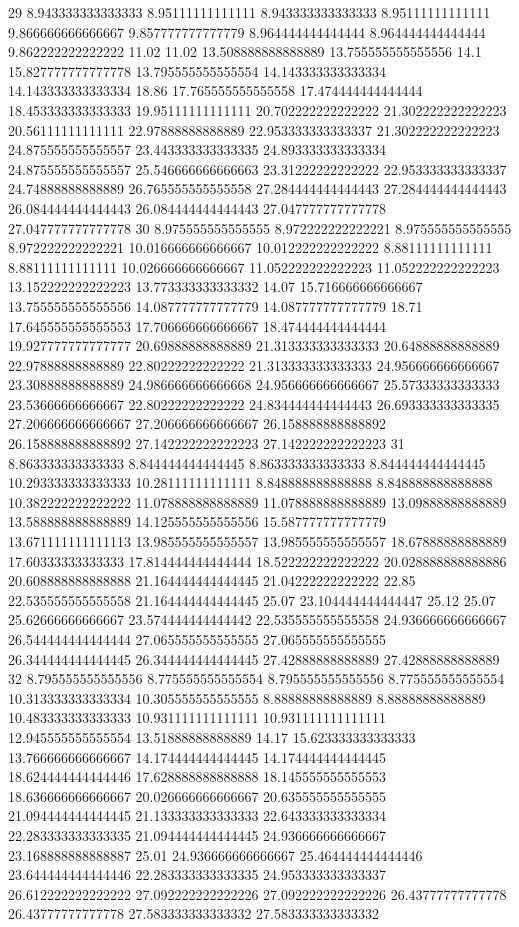 29 8.943333333333333 8.95111111111111 8.943333333333333 8.95111111111111 9.866666666666667 9.857777777777779 8.964444444444444 8.964444444444444 9.862222222222222 11.02 11.02 13.508888888888889 13.755555555555556 14.1 15.827777777777778 13.795555555555554 14.143333333333334 14.143333333333334 18.86 17.765555555555558 17.474444444444444 18.453333333333333 19.95111111111111 20.702222222222222 21.302222222222223 20.56111111111111 22.97888888888889 22.953333333333337 21.302222222222223 24.875555555555557 23.443333333333335 24.893333333333334 24.875555555555557 25.546666666666663 23.31222222222222 22.953333333333337 24.74888888888889 26.765555555555558 27.284444444444443 27.284444444444443 26.084444444444443 26.084444444444443 27.047777777777778 27.047777777777778
30 8.975555555555555 8.972222222222221 8.975555555555555 8.972222222222221 10.016666666666667 10.012222222222222 8.88111111111111 8.88111111111111 10.026666666666667 11.052222222222223 11.052222222222223 13.152222222222223 13.773333333333332 14.07 15.716666666666667 13.755555555555556 14.087777777777779 14.087777777777779 18.71 17.645555555555553 17.706666666666667 18.474444444444444 19.927777777777777 20.69888888888889 21.313333333333333 20.64888888888889 22.97888888888889 22.80222222222222 21.313333333333333 24.956666666666667 23.30888888888889 24.986666666666668 24.956666666666667 25.57333333333333 23.53666666666667 22.80222222222222 24.834444444444443 26.693333333333335 27.206666666666667 27.206666666666667 26.158888888888892 26.158888888888892 27.142222222222223 27.142222222222223
31 8.863333333333333 8.844444444444445 8.863333333333333 8.844444444444445 10.293333333333333 10.28111111111111 8.848888888888888 8.848888888888888 10.382222222222222 11.078888888888889 11.078888888888889 13.09888888888889 13.588888888888889 14.125555555555556 15.587777777777779 13.671111111111113 13.985555555555557 13.985555555555557 18.67888888888889 17.60333333333333 17.814444444444444 18.522222222222222 20.028888888888886 20.608888888888888 21.164444444444445 21.04222222222222 22.85 22.535555555555558 21.164444444444445 25.07 23.104444444444447 25.12 25.07 25.62666666666667 23.574444444444442 22.535555555555558 24.936666666666667 26.544444444444444 27.065555555555555 27.065555555555555 26.344444444444445 26.344444444444445 27.42888888888889 27.42888888888889
32 8.795555555555556 8.775555555555554 8.795555555555556 8.775555555555554 10.313333333333334 10.305555555555555 8.88888888888889 8.88888888888889 10.483333333333333 10.931111111111111 10.931111111111111 12.945555555555554 13.51888888888889 14.17 15.623333333333333 13.766666666666667 14.174444444444445 14.174444444444445 18.624444444444446 17.628888888888888 18.145555555555553 18.636666666666667 20.026666666666667 20.635555555555555 21.094444444444445 21.133333333333333 22.643333333333334 22.283333333333335 21.094444444444445 24.936666666666667 23.168888888888887 25.01 24.936666666666667 25.464444444444446 23.644444444444446 22.283333333333335 24.953333333333337 26.612222222222222 27.092222222222226 27.092222222222226 26.43777777777778 26.43777777777778 27.583333333333332 27.583333333333332

